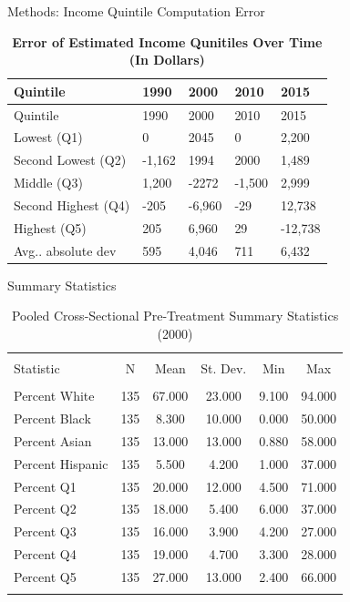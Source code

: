 \documentclass[11pt,ignorenonframetext,]{beamer}
\begin{document}
\begin{frame}{Methods: Income Quintile Computation Error}
\protect\hypertarget{methods-income-quintile-computation-error}{}

\begin{longtable}[]{@{}lllll@{}}
\caption{\textbf{Error of Estimated Income Qunitiles Over Time (In
Dollars)}}\tabularnewline
\toprule
Quintile & 1990 & 2000 & 2010 & 2015\tabularnewline
\midrule
\endfirsthead
\toprule
Quintile & 1990 & 2000 & 2010 & 2015\tabularnewline
\midrule
\endhead
Lowest (Q1) & 0 & 2045 & 0 & 2,200\tabularnewline
Second Lowest (Q2) & -1,162 & 1994 & 2000 & 1,489\tabularnewline
Middle (Q3) & 1,200 & -2272 & -1,500 & 2,999\tabularnewline
Second Highest (Q4) & -205 & -6,960 & -29 & 12,738\tabularnewline
Highest (Q5) & 205 & 6,960 & 29 & -12,738\tabularnewline
Avg.. absolute dev & 595 & 4,046 & 711 & 6,432\tabularnewline
\bottomrule
\end{longtable}

\end{frame}

\begin{frame}{Summary Statistics}
\protect\hypertarget{summary-statistics}{}

\begin{table}[!htbp] \centering 
  \caption{Pooled Cross-Sectional Pre-Treatment Summary Statistics (2000)} 
  \label{} 
\begin{tabular}{@{\extracolsep{5pt}}lccccc} 
\\[-1.8ex]\hline \\[-1.8ex] 
Statistic & \multicolumn{1}{c}{N} & \multicolumn{1}{c}{Mean} & \multicolumn{1}{c}{St. Dev.} & \multicolumn{1}{c}{Min} & \multicolumn{1}{c}{Max} \\ 
\hline \\[-1.8ex] 
Percent White & 135 & 67.000 & 23.000 & 9.100 & 94.000 \\ 
Percent Black & 135 & 8.300 & 10.000 & 0.000 & 50.000 \\ 
Percent Asian & 135 & 13.000 & 13.000 & 0.880 & 58.000 \\ 
Percent Hispanic & 135 & 5.500 & 4.200 & 1.000 & 37.000 \\ 
Percent Q1 & 135 & 20.000 & 12.000 & 4.500 & 71.000 \\ 
Percent Q2 & 135 & 18.000 & 5.400 & 6.000 & 37.000 \\ 
Percent Q3 & 135 & 16.000 & 3.900 & 4.200 & 27.000 \\ 
Percent Q4 & 135 & 19.000 & 4.700 & 3.300 & 28.000 \\ 
Percent Q5 & 135 & 27.000 & 13.000 & 2.400 & 66.000 \\ 
\hline \\[-1.8ex] 
\end{tabular} 
\end{table}

\end{frame}
\end{document}
